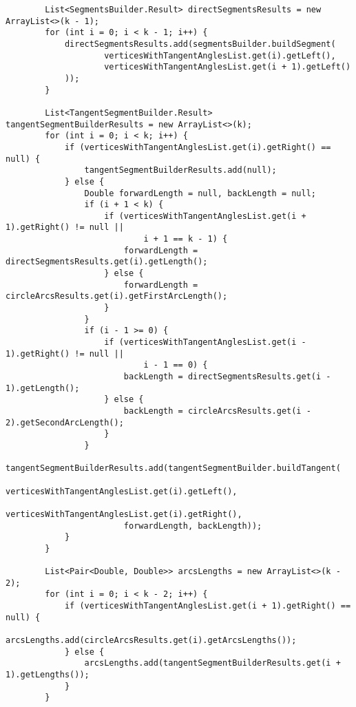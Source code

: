 \begin{verbatim}
        List<SegmentsBuilder.Result> directSegmentsResults = new ArrayList<>(k - 1);
        for (int i = 0; i < k - 1; i++) {
            directSegmentsResults.add(segmentsBuilder.buildSegment(
                    verticesWithTangentAnglesList.get(i).getLeft(),
                    verticesWithTangentAnglesList.get(i + 1).getLeft()
            ));
        }

        List<TangentSegmentBuilder.Result> tangentSegmentBuilderResults = new ArrayList<>(k);
        for (int i = 0; i < k; i++) {
            if (verticesWithTangentAnglesList.get(i).getRight() == null) {
                tangentSegmentBuilderResults.add(null);
            } else {
                Double forwardLength = null, backLength = null;
                if (i + 1 < k) {
                    if (verticesWithTangentAnglesList.get(i + 1).getRight() != null ||
                            i + 1 == k - 1) {
                        forwardLength = directSegmentsResults.get(i).getLength();
                    } else {
                        forwardLength = circleArcsResults.get(i).getFirstArcLength();
                    }
                }
                if (i - 1 >= 0) {
                    if (verticesWithTangentAnglesList.get(i - 1).getRight() != null ||
                            i - 1 == 0) {
                        backLength = directSegmentsResults.get(i - 1).getLength();
                    } else {
                        backLength = circleArcsResults.get(i - 2).getSecondArcLength();
                    }
                }
                tangentSegmentBuilderResults.add(tangentSegmentBuilder.buildTangent(
                        verticesWithTangentAnglesList.get(i).getLeft(),
                        verticesWithTangentAnglesList.get(i).getRight(),
                        forwardLength, backLength));
            }
        }

        List<Pair<Double, Double>> arcsLengths = new ArrayList<>(k - 2);
        for (int i = 0; i < k - 2; i++) {
            if (verticesWithTangentAnglesList.get(i + 1).getRight() == null) {
                arcsLengths.add(circleArcsResults.get(i).getArcsLengths());
            } else {
                arcsLengths.add(tangentSegmentBuilderResults.get(i + 1).getLengths());
            }
        }


\end{verbatim}
